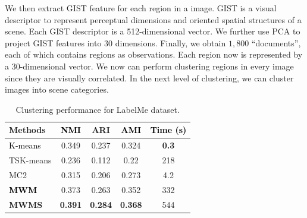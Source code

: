 We then extract GIST feature \cite{Oliva-2001} for each region in a image.
GIST is a visual descriptor to represent perceptual dimensions and
oriented spatial structures of a scene. Each GIST descriptor is a
512-dimensional vector. We further use PCA to project GIST features
into 30 dimensions. Finally, we obtain $1,800$ ``documents'', each
of which contains regions as observations. Each region now is represented
by a 30-dimensional vector. We now can perform clustering regions
in every image since they are visually correlated. In the next level
of clustering, we can cluster images into scene categories.
\begin{table}
\caption{Clustering performance for LabelMe
dataset.}
\label{tab:clustering_metrics}
\centering
\begin{tabular}{lcccc}
\toprule
Methods & \textcolor{black}{NMI} & ARI & \textcolor{black}{AMI} & \textcolor{black}{Time (s) } \\
\midrule
\textcolor{black}{K-means} & 0.349 & 0.237 & 0.324 & \textbf{0.3}\\
TSK-means & 0.236 & 0.112 & 0.22 & 218\\
MC2 & 0.315 & 0.206 & 0.273 & 4.2\\
\textbf{\textcolor{black}{MWM}} & 0.373 & 0.263 & 0.352 & 332 \\
\textbf{MWMS} & \textbf{0.391} & \textbf{0.284} & \textbf{0.368} & 544 \\
\bottomrule
\end{tabular}
\end{table}



